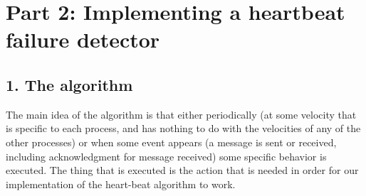 \documentclass[12pt]{article}
\theoremstyle{plain}
\begin{document}
\section*{\textbf{Part 2: Implementing a heartbeat failure detector}}

\subsection*{1. The algorithm} %
\label{sub:The algorithm}

The main idea of the algorithm is that either periodically (at some velocity
that is specific to each process, and has nothing to do with the velocities
of any of the other processes) or when some event appears (a message is sent or
received, including acknowledgment for message received) some specific behavior 
is executed. The thing that is executed is the action that is needed in order
for our implementation of the heart-beat algorithm to work. 
\end{document}
